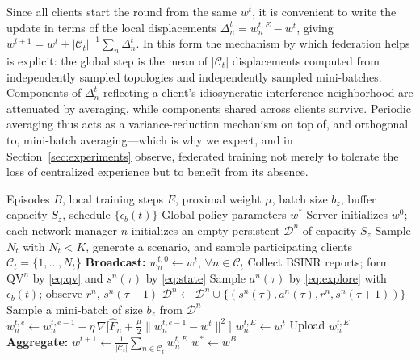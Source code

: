 \documentclass[journal]{IEEEtran}
\newcommand{\OURS}{\textsc{Carlton\,FL}}
\begin{document}
Since all clients start the round from the same $w^{t}$, it is convenient to
write the update in terms of the local displacements
$\Delta_{n}^{t} = w^{t,E}_{n} - w^{t}$, giving
$w^{t+1} = w^{t} + |\mathcal{C}_{t}|^{-1}\sum_{n} \Delta_{n}^{t}$. In this form
the mechanism by which federation helps is explicit: the global step is the
mean of $|\mathcal{C}_{t}|$ displacements computed from independently sampled
topologies and independently sampled mini-batches. Components of
$\Delta^{t}_{n}$ reflecting a client's idiosyncratic interference neighborhood
are attenuated by averaging, while components shared across clients survive.
Periodic averaging thus acts as a variance-reduction mechanism on top of, and
orthogonal to, mini-batch averaging---which is why we expect, and in
Section~\ref{sec:experiments} observe, federated training not merely to
tolerate the loss of centralized experience but to benefit from its absence.

\begin{algorithm}[!t]
\caption{\OURS{} training procedure}
\label{alg:frl}
\begin{algorithmic}[1]
\Require Episodes $B$, local training steps $E$, proximal weight $\mu$, batch size
         $b_{z}$, buffer capacity $S_{z}$, schedule $\{\epsilon_{b}(t)\}$
\Ensure  Global policy parameters $w^{*}$
\State Server initializes $w^{0}$; each network manager $n$ initializes an empty
       persistent $\mathcal{D}^{n}$ of capacity $S_{z}$
  \State Sample $N_{t}$ with $N_{t} < K$, generate a scenario,
         and sample participating clients $\mathcal{C}_{t}=\{1,\ldots,N_{t}\}$
  \State \textbf{Broadcast:} $w^{t,0}_{n} \gets w^{t}$,\;
         $\forall n \in \mathcal{C}_{t}$
      \State Collect BSINR reports; form $\mathrm{QV}^{n}$ by \eqref{eq:qv} and
             $s^{n}(\tau)$ by \eqref{eq:state}
      \State Sample $a^{n}(\tau)$ by \eqref{eq:explore} with $\epsilon_{b}(t)$;
             observe $r^{n}$, $s^{n}(\tau{+}1)$
      \State $\mathcal{D}^{n} \gets \mathcal{D}^{n} \cup
             \{(s^{n}(\tau),a^{n}(\tau),r^{n},s^{n}(\tau{+}1))\}$
    \EndFor
  \EndFor
        \State Sample a mini-batch of size $b_{z}$ from $\mathcal{D}^{n}$
        \State $w^{t,e}_{n} \gets w^{t,e-1}_{n} - \eta\,\nabla
               \bigl[\widehat{F}_{n} + \tfrac{\mu}{2}
               \lVert w^{t,e-1}_{n} - w^{t}\rVert^{2}\bigr]$
      \EndFor
    \Else
      \State $w^{t,E}_{n} \gets w^{t}$
    \EndIf
    \State Upload $w^{t,E}_{n}$
  \EndFor
  \State \textbf{Aggregate:} $w^{t+1} \gets
         \frac{1}{|\mathcal{C}_{t}|}\sum_{n \in \mathcal{C}_{t}} w^{t,E}_{n}$
\EndFor
\State \Return $w^{*} \gets w^{B}$
\end{algorithmic}
\end{algorithm}
\end{document}
